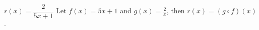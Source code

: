 {$r(x) = \dfrac{2}{5x+1}$}
{Let $f(x) = 5x+1$ and $g(x) = \frac{2}{x}$, then $r(x) =(g\circ f)(x)$.}